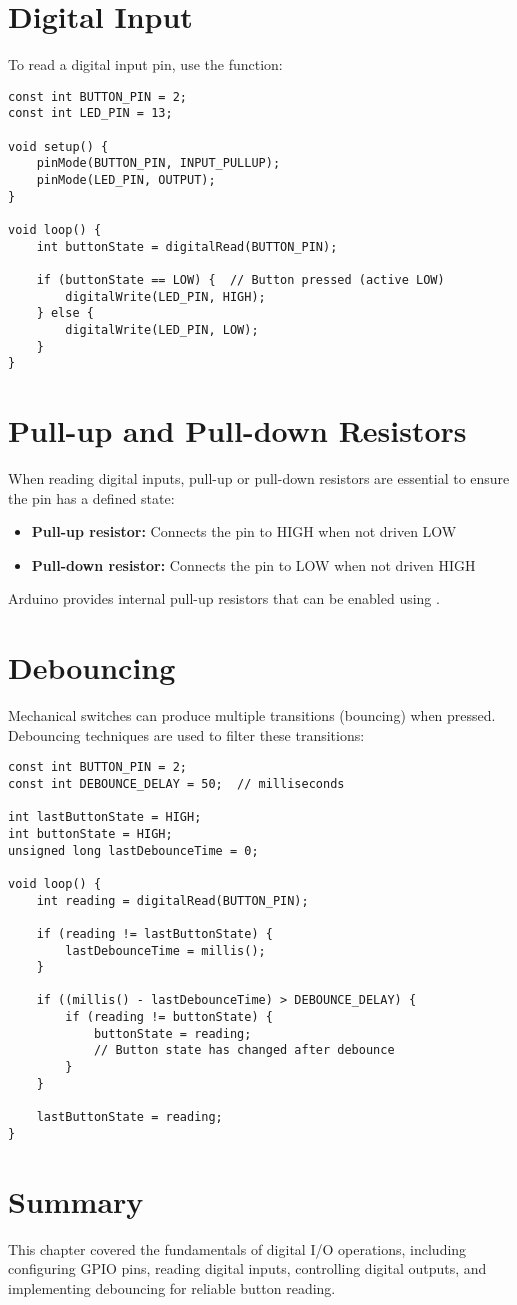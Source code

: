 \section{Digital Input}

To read a digital input pin, use the  function:

\begin{lstlisting}[caption=Reading a Button]
const int BUTTON_PIN = 2;
const int LED_PIN = 13;

void setup() {
    pinMode(BUTTON_PIN, INPUT_PULLUP);
    pinMode(LED_PIN, OUTPUT);
}

void loop() {
    int buttonState = digitalRead(BUTTON_PIN);
    
    if (buttonState == LOW) {  // Button pressed (active LOW)
        digitalWrite(LED_PIN, HIGH);
    } else {
        digitalWrite(LED_PIN, LOW);
    }
}
\end{lstlisting}

\section{Pull-up and Pull-down Resistors}

When reading digital inputs, pull-up or pull-down resistors are essential to ensure the pin has a defined state:

\begin{itemize}
    \item \textbf{Pull-up resistor:} Connects the pin to HIGH when not driven LOW
    \item \textbf{Pull-down resistor:} Connects the pin to LOW when not driven HIGH
\end{itemize}

Arduino provides internal pull-up resistors that can be enabled using .

\section{Debouncing}

Mechanical switches can produce multiple transitions (bouncing) when pressed. Debouncing techniques are used to filter these transitions:

\begin{lstlisting}[caption=Simple Software Debouncing]
const int BUTTON_PIN = 2;
const int DEBOUNCE_DELAY = 50;  // milliseconds

int lastButtonState = HIGH;
int buttonState = HIGH;
unsigned long lastDebounceTime = 0;

void loop() {
    int reading = digitalRead(BUTTON_PIN);
    
    if (reading != lastButtonState) {
        lastDebounceTime = millis();
    }
    
    if ((millis() - lastDebounceTime) > DEBOUNCE_DELAY) {
        if (reading != buttonState) {
            buttonState = reading;
            // Button state has changed after debounce
        }
    }
    
    lastButtonState = reading;
}
\end{lstlisting}

\section{Summary}

This chapter covered the fundamentals of digital I/O operations, including configuring GPIO pins, reading digital inputs, controlling digital outputs, and implementing debouncing for reliable button reading.
